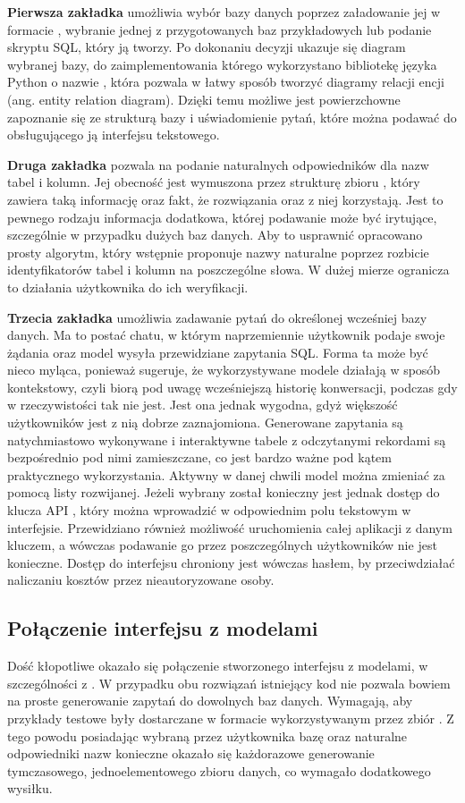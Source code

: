\textbf{Pierwsza zakładka} umożliwia wybór bazy danych poprzez załadowanie jej w formacie , wybranie jednej z przygotowanych baz przykładowych lub podanie skryptu SQL, który ją tworzy. Po dokonaniu decyzji ukazuje się diagram wybranej bazy, do zaimplementowania którego wykorzystano bibliotekę języka Python o nazwie , która pozwala w łatwy sposób tworzyć diagramy relacji encji (ang. entity relation diagram). Dzięki temu możliwe jest powierzchowne zapoznanie się ze strukturą bazy i uświadomienie pytań, które można podawać do obsługującego ją interfejsu tekstowego.

\textbf{Druga zakładka} pozwala na podanie naturalnych odpowiedników dla nazw tabel i kolumn. Jej obecność jest wymuszona przez strukturę zbioru , który zawiera taką informację oraz fakt, że rozwiązania  oraz  z niej korzystają. Jest to pewnego rodzaju informacja dodatkowa, której podawanie może być irytujące, szczególnie w przypadku dużych baz danych. Aby to usprawnić opracowano prosty algorytm, który wstępnie proponuje nazwy naturalne poprzez rozbicie identyfikatorów tabel i kolumn na poszczególne słowa. W dużej mierze ogranicza to działania użytkownika do ich weryfikacji.

\textbf{Trzecia zakładka} umożliwia zadawanie pytań do określonej wcześniej bazy danych. Ma to postać chatu, w którym naprzemiennie użytkownik podaje swoje żądania oraz model wysyła przewidziane zapytania SQL. Forma ta może być nieco myląca, ponieważ sugeruje, że wykorzystywane modele działają w sposób kontekstowy, czyli biorą pod uwagę wcześniejszą historię konwersacji, podczas gdy w rzeczywistości tak nie jest. Jest ona jednak wygodna, gdyż większość użytkowników jest z nią dobrze zaznajomiona. Generowane zapytania są natychmiastowo wykonywane i interaktywne tabele z odczytanymi rekordami są bezpośrednio pod nimi zamieszczane, co jest bardzo ważne pod kątem praktycznego wykorzystania. Aktywny w danej chwili model można zmieniać za pomocą listy rozwijanej. Jeżeli wybrany został  konieczny jest jednak dostęp do klucza API , który można wprowadzić w odpowiednim polu tekstowym w interfejsie. Przewidziano również możliwość uruchomienia całej aplikacji z danym kluczem, a wówczas podawanie go przez poszczególnych użytkowników nie jest konieczne. Dostęp do interfejsu chroniony jest wówczas hasłem, by przeciwdziałać naliczaniu kosztów przez nieautoryzowane osoby.

\subsection{Połączenie interfejsu z modelami}
Dość kłopotliwe okazało się połączenie stworzonego interfejsu z modelami, w szczególności z . W przypadku obu rozwiązań istniejący kod nie pozwala bowiem na proste generowanie zapytań do dowolnych baz danych. Wymagają, aby przykłady testowe były dostarczane w formacie wykorzystywanym przez zbiór . Z tego powodu posiadając wybraną przez użytkownika bazę oraz naturalne odpowiedniki nazw konieczne okazało się każdorazowe generowanie tymczasowego, jednoelementowego zbioru danych, co wymagało dodatkowego wysiłku.

